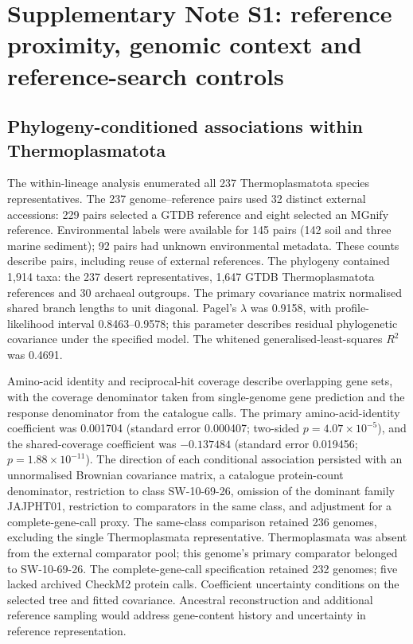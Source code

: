 \documentclass[11pt]{article}
\begin{document}
\section*{Supplementary Note S1: reference proximity, genomic context and reference-search controls}

\subsection*{Phylogeny-conditioned associations within Thermoplasmatota}
The within-lineage analysis enumerated all 237 Thermoplasmatota species representatives.
The 237 genome--reference pairs used 32 distinct external accessions: 229 pairs selected a GTDB
reference and eight selected an MGnify reference. Environmental labels were available for 145
pairs (142 soil and three marine sediment); 92 pairs had unknown environmental metadata.
These counts describe pairs, including reuse of external references. The phylogeny contained
1{,}914 taxa: the 237 desert representatives, 1{,}647 GTDB Thermoplasmatota references and 30
archaeal outgroups. The primary covariance matrix normalised shared branch lengths to unit
diagonal. Pagel's $\lambda$ was 0.9158, with profile-likelihood interval 0.8463--0.9578;
this parameter describes residual phylogenetic covariance under the specified model.
The whitened generalised-least-squares $R^2$ was 0.4691.

Amino-acid identity and reciprocal-hit coverage describe overlapping gene sets, with the
coverage denominator taken from single-genome gene prediction and the response denominator
from the catalogue calls. The primary amino-acid-identity coefficient was 0.001704
(standard error 0.000407; two-sided $p=4.07\times10^{-5}$), and the shared-coverage coefficient
was $-0.137484$ (standard error 0.019456; $p=1.88\times10^{-11}$).
The direction of each conditional association persisted with an unnormalised Brownian
covariance matrix, a catalogue protein-count denominator, restriction to class SW-10-69-26,
omission of the dominant family JAJPHT01, restriction to comparators in the same class,
and adjustment for a complete-gene-call proxy. The same-class comparison retained 236 genomes,
excluding the single Thermoplasmata representative. Thermoplasmata was absent from the external
comparator pool; this genome's primary comparator belonged to SW-10-69-26. The complete-gene-call specification retained 232 genomes;
five lacked archived CheckM2 protein calls. Coefficient uncertainty conditions on the selected
tree and fitted covariance. Ancestral reconstruction and additional reference sampling would
address gene-content history and uncertainty in reference representation.
\end{document}
